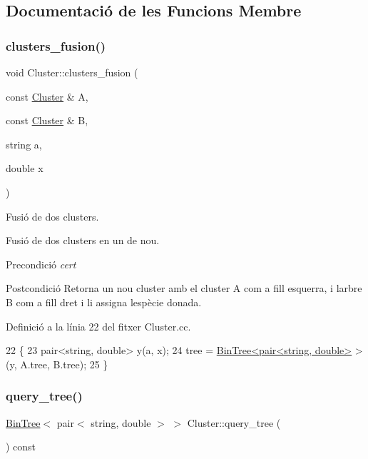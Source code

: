 \subsection{Documentació de les Funcions Membre}
\mbox{\label{class_cluster_a6b25af7d4f702db942878dba136fe0c2}} 
\subsubsection{\texorpdfstring{clusters\+\_\+fusion()}{clusters\_fusion()}}
{\footnotesize\ttfamily void Cluster\+::clusters\+\_\+fusion (\begin{DoxyParamCaption}\item[{const \hyperlink{class_cluster}{Cluster} \&}]{A,  }\item[{const \hyperlink{class_cluster}{Cluster} \&}]{B,  }\item[{string}]{a,  }\item[{double}]{x }\end{DoxyParamCaption})}



Fusió de dos clusters. 

Fusió de dos clusters en un de nou.

\begin{DoxyPrecond}{Precondició}
{\itshape cert} 
\end{DoxyPrecond}
\begin{DoxyPostcond}{Postcondició}
Retorna un nou cluster amb el cluster A com a fill esquerra, i l\textquotesingle{}arbre B com a fill dret i li assigna l\textquotesingle{}espècie donada. 
\end{DoxyPostcond}


Definició a la línia 22 del fitxer Cluster.\+cc.


\begin{DoxyCode}
22                                                                                     \{
23     pair<string, double> y(a, x);
24     tree = \hyperlink{class_bin_tree}{BinTree<pair<string, double>} > (y, A.tree, B.tree);
25 \}
\end{DoxyCode}
\mbox{\label{class_cluster_ac29060dfec64d073f740f7408ecabbbe}} 
\subsubsection{\texorpdfstring{query\+\_\+tree()}{query\_tree()}}
{\footnotesize\ttfamily \hyperlink{class_bin_tree}{Bin\+Tree}$<$ pair$<$ string, double $>$ $>$ Cluster\+::query\+\_\+tree (\begin{DoxyParamCaption}{ }\end{DoxyParamCaption}) const}



